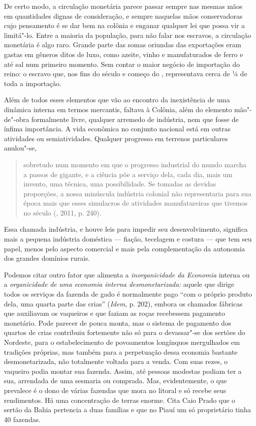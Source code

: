 De certo modo, a circulação monetária parece passar sempre nas mesmas
mãos em quantidades dignas de consideração, e sempre naquelas mãos
conservadoras cujo pensamento é se dar bem na colônia e enganar qualquer
lei que possa vir a limitá"-lo. Entre a maioria da população, para não
falar nos escravos, a circulação monetária é algo raro. Grande parte das
somas oriundas das exportações eram gastas em gêneros ditos de luxo,
como azeite, vinho e manufaturados de ferro e até sal num primeiro
momento. Sem contar o maior negócio de importação do reino: o escravo
que, nos fins do século  e começo do , representava cerca de ¼
de toda a importação.

Além de todos esses elementos que vão ao encontro da inexistência de uma
dinâmica interna em termos mercantis, faltava à Colônia, além do
elemento mão"-de"-obra formalmente livre, qualquer arremedo de indústria,
nem que fosse de ínfima importância. A vida econômica no conjunto
nacional está em outras atividades ou semiatividades. Qualquer progresso
em terrenos particulares anulou"-se,

\begin{quote}
sobretudo num momento em que o progresso industrial do mundo marcha a
passos de gigante, e a ciência põe a serviço dela, cada dia, mais um
invento, uma técnica, uma possibilidade. Se tomadas as devidas
proporções, a nossa minúscula indústria colonial não representaria para
sua época mais que esses simulacros de atividades manufatureiras que
tivemos no século  (, 2011, p. 240).
\end{quote}

Essa chamada indústria, e houve leis para impedir seu desenvolvimento,
significa mais a pequena indústria doméstica --- fiação, tecelagem e
costura --- que tem seu papel, menos pelo aspecto comercial e mais pela
complementação da autonomia dos grandes domínios rurais.

Podemos citar outro fator que alimenta a \emph{inorganicidade da
Economia} interna ou a \emph{organicidade de uma economia interna
desmonetarizada:} aquele que dirige todos os serviços da fazenda de gado
é normalmente pago ``com o próprio produto dela, uma quarta parte das
crias'' (\emph{Idem}, p. 202), embora os chamados fábricas que
auxiliavam os vaqueiros e que faziam as roças recebessem pagamento
monetário. Pode parecer de pouca monta, mas o sistema de pagamento dos
quartos de crias contribuiu fortemente não só para o devassar"-se dos
sertões do Nordeste, para o estabelecimento de povoamentos longínquos
mergulhados em tradições próprias, mas também para a perpetuação dessa
economia bastante desmonetarizada, não totalmente voltada para a venda.
Com suas rezes, o vaqueiro podia montar sua fazenda. Assim, até pessoas
modestas podiam ter a sua, arrendada de uma sesmaria ou comprada. Mas,
evidentemente, o que prevalece é o dono de várias fazendas que mora no
litoral e só recebe seus rendimentos. Há uma concentração de terras
enorme. Cita Caio Prado que o sertão da Bahia pertencia a duas famílias
e que no Piauí um só proprietário tinha 40 fazendas.

